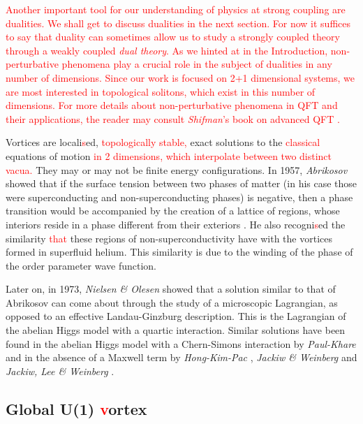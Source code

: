         \textcolor{red}{Another important tool for our understanding of physics at strong coupling are dualities. We shall get to discuss dualities in the next section. For now it suffices to say that duality can sometimes allow us to study a strongly coupled theory through a weakly coupled \textit{dual theory}. As we hinted at in the Introduction, non-perturbative phenomena play a crucial role in the subject of dualities in any number of dimensions. Since our work is focused on 2+1 dimensional systems, we are most interested in topological solitons, which exist in this number of dimensions. For more details about non-perturbative phenomena in QFT and their applications, the reader may consult \textit{Shifman}'s book on advanced QFT \cite{shifman2012}. }
        
        Vortices are locali\textcolor{red}{s}ed, \textcolor{red}{ topologically stable,} exact solutions to the \textcolor{red}{classical} equations of motion \textcolor{red}{ in 2 dimensions, which interpolate between two distinct vacua.}  They may or may not be finite energy configurations.
        In 1957, \textit{Abrikosov}  showed that if the surface tension between two phases of matter (in his case those were superconducting and non-superconducting phases) is negative, then a phase transition would be accompanied by the creation of a lattice of regions, whose interiors reside in a phase different from their exteriors \cite{Abrikosov1957}. He also recogni\textcolor{red}{s}ed the similarity \textcolor{red}{that} these regions of non-superconductivity have with the vortices formed in superfluid helium. This similarity is due to the winding of the phase of the order parameter wave function.


        Later on, in 1973, \textit{Nielsen \& Olesen} \cite{Nielsen:1973cs} showed that a solution similar to that of Abrikosov can come about through the study of a microscopic Lagrangian, as opposed to an effective Landau-Ginzburg description. This is the Lagrangian of the abelian Higgs model with a quartic interaction. Similar solutions have been found in the abelian Higgs model with a Chern-Simons interaction by \textit{Paul-Khare} \cite{Paul:1986ix} and in the absence of a Maxwell term by \textit{Hong-Kim-Pac} \cite{Hong:1990yh}, \textit{Jackiw \& Weinberg} \cite{Jackiw:1990aw} and \textit{Jackiw, Lee \& Weinberg} \cite{Jackiw:1990pr}.

        \subsection{Global U(1) \textcolor{red}{v}ortex}

